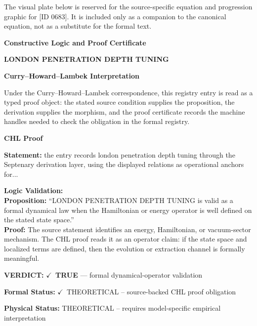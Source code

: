 \begingroup\footnotesize\sloppy
The visual plate below is reserved for the source-specific equation and progression graphic for [ID 0683]. It is included only as a companion to the canonical equation, not as a substitute for the formal text.
\par\endgroup
\ifTZPDarkEdition
{}
\fi

\clearpage
\begingroup\tzpsupportsetup
\noindent\textbf{\fontsize{10.8pt}{12.8pt}\selectfont [ID 0683] Constructive Logic and Proof Certificate}\par
\noindent\textbf{\fontsize{10pt}{12pt}\selectfont LONDON PENETRATION DEPTH TUNING}\par
\vspace{0.45em}
\begingroup
\footnotesize
\setlength{\parskip}{0.22em}
\setlength{\parindent}{0pt}
\noindent\textbf{Curry--Howard--Lambek Interpretation}\par
Under the Curry--Howard--Lambek correspondence, this registry entry is read as a typed proof
object: the stated source condition supplies the proposition, the derivation supplies the
morphism, and the proof certificate records the machine handles needed to check the obligation
in the formal registry.

\vspace{0.45em}
\noindent\textbf{CHL Proof}\par
\textbf{Statement:} the entry records london penetration depth tuning through the Septenary derivation
layer, using the displayed relations as operational anchors for...

\textbf{Logic Validation:}\\
\textbf{Proposition:} ``LONDON PENETRATION DEPTH TUNING is valid as a formal dynamical law when the Hamiltonian
or energy operator is well defined on the stated state space.''\\
\textbf{Proof:} The source statement identifies an energy, Hamiltonian, or vacuum-sector mechanism. The
CHL proof reads it as an operator claim: if the state space and localized terms are
defined, then the evolution or extraction channel is formally meaningful.

\textbf{VERDICT:} \ensuremath{\checkmark}\ \textbf{TRUE} --- formal dynamical-operator validation

\textbf{Formal Status:} \ensuremath{\checkmark}\ THEORETICAL -- source-backed CHL proof obligation

\textbf{Physical Status:} THEORETICAL -- requires model-specific empirical interpretation
\par\vspace{0.45em}
\par
\ifTZPDarkEdition
{}
\fi
\endgroup
\endgroup
